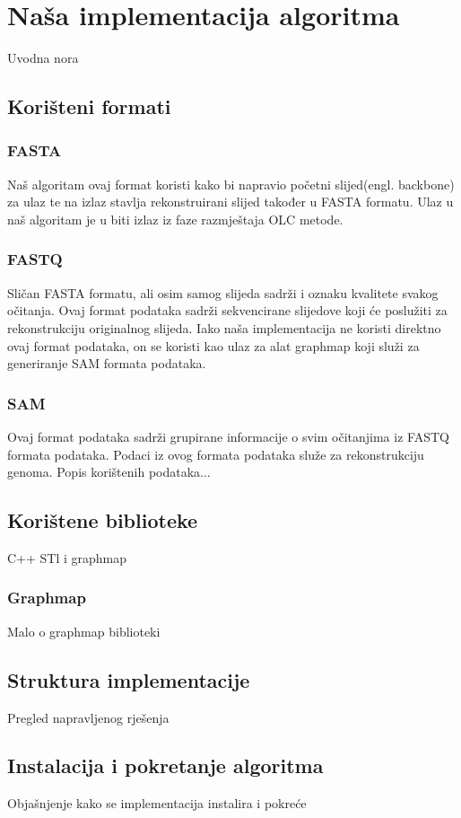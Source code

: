 \documentclass[times, utf8, seminar, numeric]{fer}
\begin{document}
\chapter{Naša implementacija algoritma}
Uvodna nora
\section{Korišteni formati}

\subsection{FASTA}
Naš algoritam ovaj format koristi kako bi napravio početni slijed(engl. backbone) za ulaz te na izlaz stavlja rekonstruirani slijed također u FASTA formatu.
Ulaz u naš algoritam je u biti izlaz iz faze razmještaja OLC metode.
\subsection{FASTQ}
Sličan FASTA formatu, ali osim samog slijeda sadrži i oznaku kvalitete svakog očitanja.
Ovaj format podataka sadrži sekvencirane slijedove koji će poslužiti za rekonstrukciju originalnog slijeda.
Iako naša implementacija ne koristi direktno ovaj format podataka, on se koristi kao ulaz za alat graphmap koji služi za generiranje SAM formata podataka.
\subsection{SAM}
Ovaj format podataka sadrži grupirane informacije o svim očitanjima iz FASTQ formata podataka. Podaci iz ovog formata podataka služe za rekonstrukciju genoma. Popis korištenih podataka...
\section{Korištene biblioteke}
C++ STl i graphmap
\subsection{Graphmap}
Malo o graphmap biblioteki
\section{Struktura implementacije}
Pregled napravljenog rješenja
\section{Instalacija i pokretanje algoritma}
Objašnjenje kako se implementacija instalira i pokreće
\end{document}
